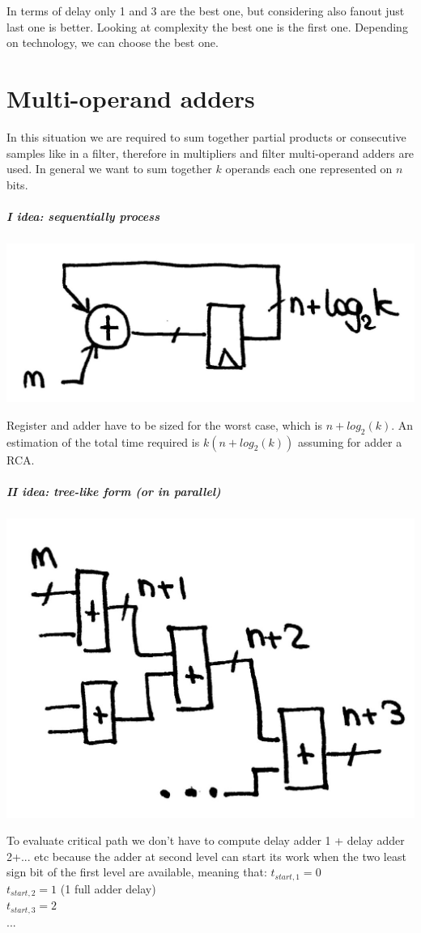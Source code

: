 In terms of delay only 1 and 3 are the best one, but considering also fanout just last one is better. Looking at complexity the best one is the first one. Depending on technology, we can choose the best one.


\section{Multi-operand adders}

In this situation we are required to sum together partial products or consecutive samples like in a filter, therefore in multipliers and filter multi-operand adders are used. In general we want to sum together $k$ operands each one represented on $n$ bits.

\subparagraph{I idea: sequentially process}
\begin{center}
  \includegraphics[width=0.5\linewidth]{img/img2/24}
\end{center}

Register and adder have to be sized for the worst case, which is $n+log_2(k)$. An estimation of the total time required is $k(n+log_2(k))$ assuming for adder a RCA.

\subparagraph{II idea: tree-like form  (or in parallel)}
\begin{center}
  \includegraphics[width=0.5\linewidth]{img/img2/25}
\end{center}

To evaluate critical path we don't have to compute delay adder 1 + delay adder 2+... etc because the adder at second level can start its work when the two least sign bit of the first level are available, meaning that:
$t_{start,1}=0$\\
$t_{start,2}=1$ (1 full adder delay)\\
$t_{start,3}=2$\\
$...$\\


